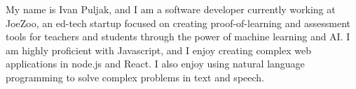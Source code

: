 

\begin{cvparagraph}

My name is Ivan Puljak, and I am a software developer currently working at JoeZoo, an ed-tech startup focused on creating proof-of-learning and assessment tools for teachers and students through the power of machine learning and AI. I am highly proficient with Javascript, and I enjoy creating complex web applications in node.js and React. I also enjoy using natural language programming to solve complex problems in text and speech.

\end{cvparagraph}

